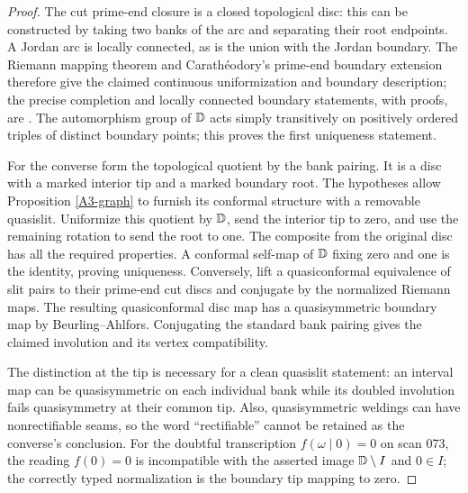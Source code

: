 \begin{proof}
The cut prime-end closure is a closed topological disc: this can be constructed by taking two banks of the arc and separating their root endpoints. A Jordan arc is locally connected, as is the union with the Jordan boundary. The Riemann mapping theorem and Carath\'eodory's prime-end boundary extension therefore give the claimed continuous uniformization and boundary description; the precise completion and locally connected boundary statements, with proofs, are \cite[Theorems 15.9, 16.6 and 16.7, pp.~15-5 and 16-2--16-4]{AMilnor1991}. The automorphism group of ${\mathbb{D}}$ acts simply transitively on positively ordered triples of distinct boundary points; this proves the first uniqueness statement.

For the converse form the topological quotient by the bank pairing. It is a disc with a marked interior tip and a marked boundary root. The hypotheses allow Proposition \ref{A3-graph} to furnish its conformal structure with a removable quasislit. Uniformize this quotient by ${\mathbb{D}}$, send the interior tip to zero, and use the remaining rotation to send the root to one. The composite from the original disc has all the required properties. A conformal self-map of ${\mathbb{D}}$ fixing zero and one is the identity, proving uniqueness. Conversely, lift a quasiconformal equivalence of slit pairs to their prime-end cut discs and conjugate by the normalized Riemann maps. The resulting quasiconformal disc map has a quasisymmetric boundary map by Beurling--Ahlfors. Conjugating the standard bank pairing gives the claimed involution and its vertex compatibility.

The distinction at the tip is necessary for a clean quasislit statement: an interval map can be quasisymmetric on each individual bank while its doubled involution fails quasisymmetry at their common tip. Also, quasisymmetric weldings can have nonrectifiable seams, so the word ``rectifiable'' cannot be retained as the converse's conclusion. For the doubtful transcription $f(\omega\mid0)=0$ on scan 073, the reading $f(0)=0$ is incompatible with the asserted image ${\mathbb{D}}\setminus I$ and $0\in I$; the correctly typed normalization is the boundary tip mapping to zero.
\end{proof}

